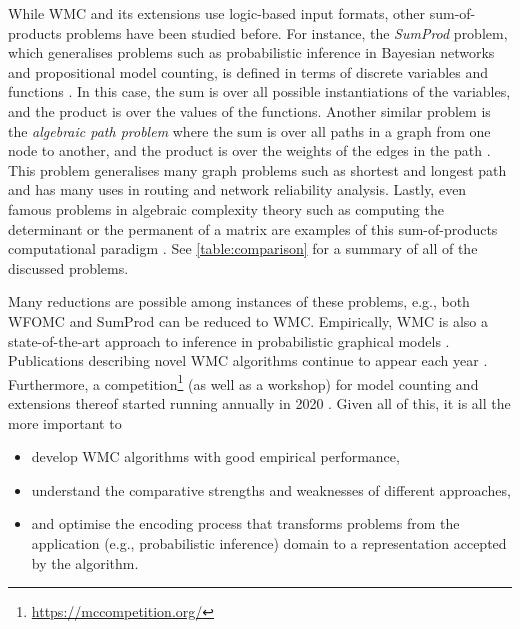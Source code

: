 While WMC and its extensions use logic-based input formats, other sum-of-products problems have been studied before. For instance, the \emph{SumProd} problem, which generalises problems such as probabilistic inference in Bayesian networks and propositional model counting, is defined in terms of discrete variables and functions \citep{DBLP:journals/jair/BacchusDP09,DBLP:journals/ai/Dechter99}. In this case, the sum is over all possible instantiations of the variables, and the product is over the values of the functions. Another similar problem is the \emph{algebraic path problem} where the sum is over all paths in a graph from one node to another, and the product is over the weights of the edges in the path \citep{DBLP:series/synthesis/2010Baras}. This problem generalises many graph problems such as shortest and longest path and has many uses in routing and network reliability analysis. Lastly, even famous problems in algebraic complexity theory such as computing the determinant or the permanent of a matrix are examples of this sum-of-products computational paradigm \citep{DBLP:books/daglib/0090316,DBLP:journals/tcs/Valiant79}. See \cref{table:comparison} for a summary of all of the discussed problems.

Many reductions are possible among instances of these problems, e.g., both WFOMC and SumProd can be reduced to WMC. Empirically, WMC is also a state-of-the-art approach to inference in probabilistic graphical models \citep{DBLP:conf/ijcai/AgrawalPM21}. Publications describing novel WMC algorithms continue to appear each year \citep{DBLP:conf/cp/DudekPV20,DBLP:conf/cp/KorhonenJ21}. Furthermore, a competition\footnote{\url{https://mccompetition.org/}} (as well as a workshop) for model counting and extensions thereof started running annually in 2020 \citep{DBLP:journals/corr/abs-2012-01323}. Given all of this, it is all the more important to
\begin{itemize}
\item develop WMC algorithms with good empirical performance,
\item understand the comparative strengths and weaknesses of different approaches,
\item and optimise the encoding process that transforms problems from the application (e.g., probabilistic inference) domain to a representation accepted by the algorithm.
\end{itemize}

